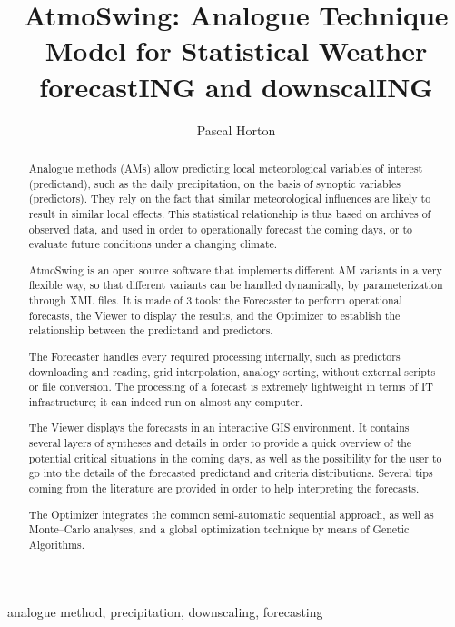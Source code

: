\documentclass[review]{elsarticle}
\begin{document}
\begin{frontmatter}

\title{AtmoSwing: Analogue Technique Model for Statistical Weather forecastING and downscalING}


\author[unibe,unil,terranum]{Pascal Horton}


\address[unibe]{University of Bern, Oeschger Centre for Climate Change Research, Institute of Geography, Bern, Switzerland}
\address[unil]{University of Lausanne, Institute of Earth Sciences, Lausanne, Switzerland}
\address[terranum]{Terranum SARL, Bussigny, Switzerland}



\begin{abstract}
Analogue methods (AMs) allow predicting local meteorological variables of interest (predictand), such as the daily precipitation, on the basis of synoptic variables (predictors). They rely on the fact that similar meteorological influences are likely to result in similar local effects. This statistical relationship is thus based on archives of observed data, and used in order to operationally forecast the coming days, or to evaluate future conditions under a changing climate.

AtmoSwing is an open source software that implements different AM variants in a very flexible way, so that different variants can be handled dynamically, by parameterization through XML files. It is made of 3 tools: the Forecaster to perform operational forecasts, the Viewer to display the results, and the Optimizer to establish the relationship between the predictand and predictors. 

The Forecaster handles every required processing internally, such as predictors downloading and reading, grid interpolation, analogy sorting, without external scripts or file conversion. The processing of a forecast is extremely lightweight in terms of IT infrastructure; it can indeed run on almost any computer.

The Viewer displays the forecasts in an interactive GIS environment. It contains several layers of syntheses and details in order to provide a quick overview of the potential critical situations in the coming days, as well as the possibility for the user to go into the details of the forecasted predictand and criteria distributions. Several tips coming from the literature are provided in order to help interpreting the forecasts.

The Optimizer integrates the common semi-automatic sequential approach, as well as Monte--Carlo analyses, and a global optimization technique by means of Genetic Algorithms. 

\end{abstract}

\begin{keyword}
analogue method, precipitation, downscaling, forecasting
\end{keyword}

\end{frontmatter}
\end{document}
